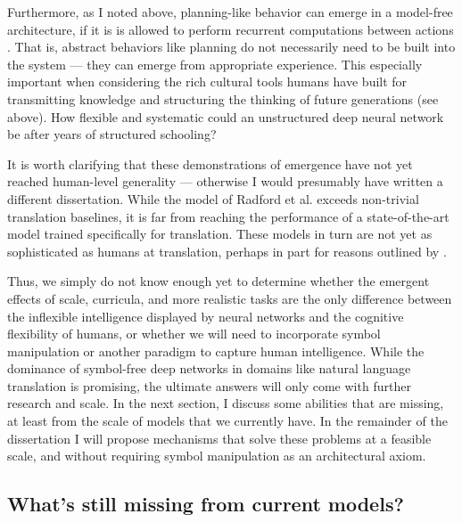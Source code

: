 Furthermore, as I noted above, planning-like behavior can emerge in a model-free architecture, if it is is allowed to perform recurrent computations between actions \cite{Guez2019}. That is, abstract behaviors like planning do not necessarily need to be built into the system --- they can emerge from appropriate experience. This especially important when considering the rich cultural tools humans have built for transmitting knowledge and structuring the thinking of future generations (see above). How flexible and systematic could an unstructured deep neural network be after years of structured schooling? \par 
It is worth clarifying that these demonstrations of emergence have not yet reached human-level generality --- otherwise I would presumably have written a different dissertation. While the model of Radford et al. exceeds non-trivial translation baselines, it is far from reaching the performance of a state-of-the-art model trained specifically for translation. These models in turn are not yet as sophisticated as humans at translation, perhaps in part for reasons outlined by \citet{McClelland2019}. \par
Thus, we simply do not know enough yet to determine whether the emergent effects of scale, curricula, and more realistic tasks are the only difference between the inflexible intelligence displayed by neural networks and the cognitive flexibility of humans, or whether we will need to incorporate symbol manipulation or another paradigm to capture human intelligence. While the dominance of symbol-free deep networks in domains like natural language translation is promising, the ultimate answers will only come with further research and scale. In the next section, I discuss some abilities that are missing, at least from the scale of models that we currently have. In the remainder of the dissertation I will propose mechanisms that solve these problems at a feasible scale, and without requiring symbol manipulation as an architectural axiom. \par 

\subsection{What's still missing from current models?}

